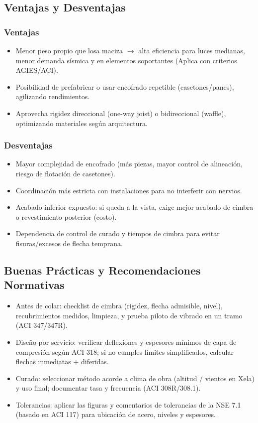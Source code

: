 \documentclass[12pt]{article}
\begin{document}
	\subsection{Ventajas y Desventajas}
	
	\subsubsection{Ventajas}
	\begin{itemize}
		\item Menor peso propio que losa maciza $\rightarrow$ alta eficiencia para luces medianas, menor demanda sísmica y en elementos soportantes (Aplica con criterios AGIES/ACI).
		\item Posibilidad de prefabricar o usar encofrado repetible (casetones/panes), agilizando rendimientos.
		\item Aprovecha rigidez direccional (one-way joist) o bidireccional (waffle), optimizando materiales según arquitectura.
	\end{itemize}
	
	\subsubsection{Desventajas}
	\begin{itemize}
		\item Mayor complejidad de encofrado (más piezas, mayor control de alineación, riesgo de flotación de casetones).
		\item Coordinación más estricta con instalaciones para no interferir con nervios.
		\item Acabado inferior expuesto: si queda a la vista, exige mejor acabado de cimbra o revestimiento posterior (costo).
		\item Dependencia de control de curado y tiempos de cimbra para evitar fisuras/excesos de flecha temprana.
	\end{itemize}
	
	\subsection{Buenas Prácticas y Recomendaciones Normativas}
	\begin{itemize}
		\item Antes de colar: checklist de cimbra (rigidez, flecha admisible, nivel), recubrimientos medidos, limpieza, y prueba piloto de vibrado en un tramo (ACI 347/347R).
		\item Diseño por servicio: verificar deflexiones y espesores mínimos de capa de compresión según ACI 318; si no cumples límites simplificados, calcular flechas inmediatas + diferidas.
		\item Curado: seleccionar método acorde a clima de obra (altitud / vientos en Xela) y uso final; documentar tasa y frecuencia (ACI 308R/308.1).
		\item Tolerancias: aplicar las figuras y comentarios de tolerancias de la NSE 7.1 (basado en ACI 117) para ubicación de acero, niveles y espesores.
	\end{itemize}
	
\end{document}
